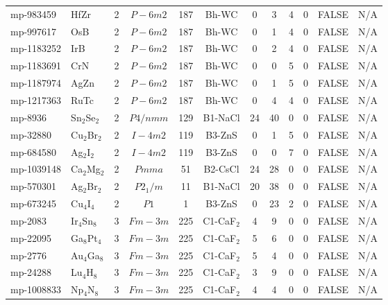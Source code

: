 {\begin{longtable}{llcccccccccc}
    mp-983459 & HfZr  & 2     & $P-6m2$ & 187   & Bh-WC & 0     & 3     & 4     & 0     & FALSE & N/A \\
    mp-997617 & OsB   & 2     & $P-6m2$ & 187   & Bh-WC & 0     & 1     & 4     & 0     & FALSE & N/A \\
    mp-1183252 & IrB   & 2     & $P-6m2$ & 187   & Bh-WC & 0     & 2     & 4     & 0     & FALSE & N/A \\
    mp-1183691 & CrN   & 2     & $P-6m2$ & 187   & Bh-WC & 0     & 0     & 5     & 0     & FALSE & N/A \\
    mp-1187974 & AgZn  & 2     & $P-6m2$ & 187   & Bh-WC & 0     & 1     & 5     & 0     & FALSE & N/A \\
    mp-1217363 & RuTc  & 2     & $P-6m2$ & 187   & Bh-WC & 0     & 4     & 4     & 0     & FALSE & N/A \\
    mp-8936 & Sn$_{2}$Se$_{2}$ & 2     & $P4/nmm$ & 129   & B1-NaCl & 24    & 40    & 0     & 0     & FALSE & N/A \\
    mp-32880 & Cu$_{2}$Br$_{2}$ & 2     & $I-4m2$ & 119   & B3-ZnS & 0     & 1     & 5     & 0     & FALSE & N/A \\
    mp-684580 & Ag$_{2}$I$_{2}$ & 2     & $I-4m2$ & 119   & B3-ZnS & 0     & 0     & 7     & 0     & FALSE & N/A \\
    mp-1039148 & Ca$_{2}$Mg$_{2}$ & 2     & $Pmma$ & 51    & B2-CsCl & 24    & 28    & 0     & 0     & FALSE & N/A \\
    mp-570301 & Ag$_{2}$Br$_{2}$ & 2     & $P2_1/m$ & 11    & B1-NaCl & 20    & 38    & 0     & 0     & FALSE & N/A \\
    mp-673245 & Cu$_{4}$I$_{4}$ & 2     & $P1$  & 1     & B3-ZnS & 0     & 23    & 2     & 0     & FALSE & N/A \\
    mp-2083 & Ir$_{4}$Sn$_{8}$ & 3     & $Fm-3m$ & 225   & C1-CaF$_{2}$ & 4     & 9     & 0     & 0     & FALSE & N/A \\
    mp-22095 & Ga$_{8}$Pt$_{4}$ & 3     & $Fm-3m$ & 225   & C1-CaF$_{2}$ & 5     & 6     & 0     & 0     & FALSE & N/A \\
    mp-2776 & Au$_{4}$Ga$_{8}$ & 3     & $Fm-3m$ & 225   & C1-CaF$_{2}$ & 5     & 4     & 0     & 0     & FALSE & N/A \\
    mp-24288 & Lu$_{4}$H$_{8}$ & 3     & $Fm-3m$ & 225   & C1-CaF$_{2}$ & 3     & 9     & 0     & 0     & FALSE & N/A \\
    mp-1008833 & Np$_{4}$N$_{8}$ & 3     & $Fm-3m$ & 225   & C1-CaF$_{2}$ & 4     & 4     & 0     & 0     & FALSE & N/A \\

\end{longtable}}
